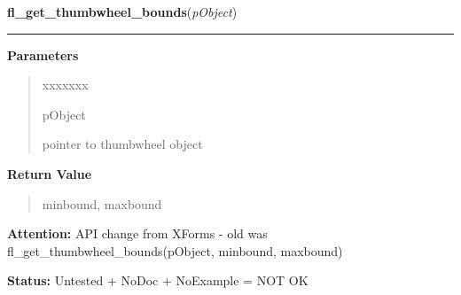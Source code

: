 \hspace{.8\funcindent}\begin{boxedminipage}{\funcwidth}

    \raggedright \textbf{fl\_get\_thumbwheel\_bounds}(\textit{pObject})

    \vspace{-1.5ex}

    \rule{\textwidth}{0.5\fboxrule}
\setlength{\parskip}{2ex}
\setlength{\parskip}{1ex}
      \textbf{Parameters}
      \vspace{-1ex}

      \begin{quote}
        \begin{Ventry}{xxxxxxx}

          \item[pObject]

          pointer to thumbwheel object

        \end{Ventry}

      \end{quote}

      \textbf{Return Value}
    \vspace{-1ex}

      \begin{quote}
      minbound, maxbound

      \end{quote}

\textbf{Attention:} API change from XForms - old was fl\_get\_thumbwheel\_bounds(pObject, 
minbound, maxbound)



\textbf{Status:} Untested + NoDoc + NoExample = NOT OK



    \end{boxedminipage}

    \label{xformslib:library:fl_create_thumbwheel}

    \vspace{0.5ex}

